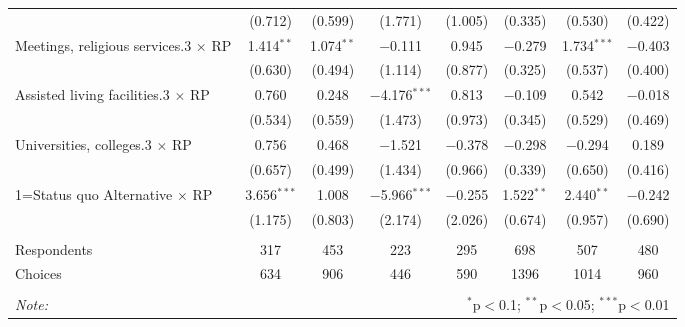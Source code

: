 \begin{table}[!htbp]
\begin{tabular}{@{\extracolsep{5pt}}lccccccc}
  & (0.712) & (0.599) & (1.771) & (1.005) & (0.335) & (0.530) & (0.422) \\ 
  Meetings, religious services.3 $\times$ RP & 1.414$^{**}$ & 1.074$^{**}$ & $-$0.111 & 0.945 & $-$0.279 & 1.734$^{***}$ & $-$0.403 \\ 
  & (0.630) & (0.494) & (1.114) & (0.877) & (0.325) & (0.537) & (0.400) \\ 
  Assisted living facilities.3 $\times$ RP & 0.760 & 0.248 & $-$4.176$^{***}$ & 0.813 & $-$0.109 & 0.542 & $-$0.018 \\ 
  & (0.534) & (0.559) & (1.473) & (0.973) & (0.345) & (0.529) & (0.469) \\ 
  Universities, colleges.3 $\times$ RP & 0.756 & 0.468 & $-$1.521 & $-$0.378 & $-$0.298 & $-$0.294 & 0.189 \\ 
  & (0.657) & (0.499) & (1.434) & (0.966) & (0.339) & (0.650) & (0.416) \\ 
  1=Status quo Alternative $\times$ RP & 3.656$^{***}$ & 1.008 & $-$5.966$^{***}$ & $-$0.255 & 1.522$^{**}$ & 2.440$^{**}$ & $-$0.242 \\ 
  & (1.175) & (0.803) & (2.174) & (2.026) & (0.674) & (0.957) & (0.690) \\ 
 \hline \\[-1.8ex] 
Respondents & 317 & 453 & 223 & 295 & 698 & 507 & 480\\ 
 Choices & 634 & 906 & 446 & 590 & 1396 & 1014 & 960\\ 
\hline 
\hline \\[-1.8ex] 
\textit{Note:}  & \multicolumn{7}{r}{$^{*}$p$<$0.1; $^{**}$p$<$0.05; $^{***}$p$<$0.01} \\ 
\end{tabular} 
\end{table} 
